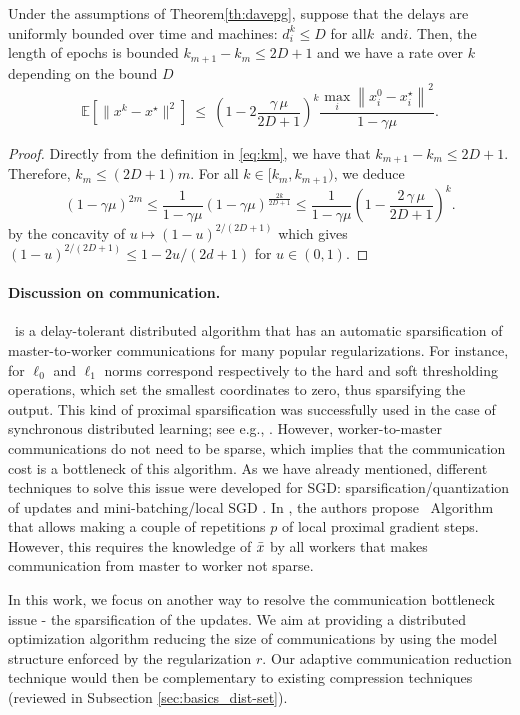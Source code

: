 \begin{corollary}\label{cor:bounded}
Under the assumptions of Theorem\;\ref{th:davepg}, suppose that the delays are uniformly bounded over time and machines: $d_i^k\leq D$ for all\;$k$~and\;$i$. Then, the length of epochs is bounded $k_{m+1} - k_m \leq 2D+1$ and we have a rate over $k$ depending on the bound $D$
$$ \mathbb{E}[\|x^k-x^\star\|^2] ~\leq~  \left( 1 - 2\frac{\gamma\,\mu}{2D+1} \right)^k  \frac{\max_i\left\|x_i^0-x_i^\star\right\|^2}{1-\gamma\mu} .
$$
\end{corollary}

\begin{proof}
Directly from the definition in \eqref{eq:km}, we have that $k_{m+1} - k_m \leq 2D+1$. Therefore, $k_m \leq (2D+1)m$. For all $k\in [k_m,k_{m+1})$, we deduce
\[
\left( 1 - \gamma\mu\right)^{2m}
\leq  \frac{1}{1-\gamma\mu} \left( 1 - \gamma\mu\right)^{\frac{2k}{2D+1}}
\leq \frac{1}{1-\gamma\mu}  \left( 1 - \frac{2\,\gamma\,\mu}{2D+1} \right)^k.
\]
by the concavity of $u\mapsto (1-u)^{2/(2D+1)}$ which gives $(1-u)^{2/(2D+1)}\leq 1-2u/(2d+1)$ for $u\in (0,1)$.
\end{proof}

{
\paragraph{Discussion on communication.}
\dave~is a delay-tolerant distributed algorithm that has an automatic sparsification of master-to-worker communications for many popular regularizations. For instance, for $\ell_0$ and $\ell_1$ norms correspond respectively to the hard and soft thresholding operations, which set the smallest coordinates to zero, thus sparsifying the output. This kind of proximal sparsification was successfully used in the case of synchronous distributed learning; see e.g., \cite{wang2017efficient,smith2015l1}. However, worker-to-master communications do not need to be sparse, which implies that the communication cost is a bottleneck of this algorithm. As we have already mentioned, different techniques to solve this issue were developed for SGD: sparsification/quantization of updates \cite{horvath2019stochastic} and mini-batching/local SGD \cite{yang2013trading, khaled2019first}. In \cite{mishchenko2018,ICML18}, the authors propose \daveR~Algorithm that allows making a couple of repetitions $p$ of local proximal gradient steps. However, this requires the knowledge of $\bar{x}$ by all workers that makes communication from master to worker not sparse.

In this work, we focus on another way to resolve the communication bottleneck issue - the sparsification of the updates. We aim at providing a distributed optimization algorithm reducing the size of communications by using the model structure enforced by the regularization $r$. Our adaptive communication reduction technique would then be complementary to existing compression techniques (reviewed in Subsection \ref{sec:basics_dist-set}).
}   




